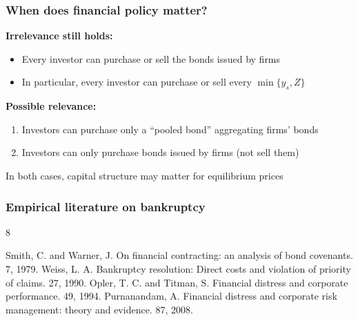 \documentclass[blue]{beamer}
\theoremstyle{definition}
\theoremstyle{example}
\begin{document}
\begin{frame}\frametitle{When does financial policy matter?}
\textbf{Irrelevance still holds:}
\begin{itemize}
\item Every investor can purchase or sell the bonds issued by firms
\item In particular, every investor can purchase or sell every $\min\{y_s, Z\}$
\end{itemize}
\bigskip

\textbf{Possible relevance:}
\begin{enumerate}
\item Investors can purchase only a ``pooled bond'' aggregating firms' bonds
\item Investors can only purchase bonds issued by firms (not sell them)
\end{enumerate}
\bigskip

In both cases, capital structure may matter for equilibrium prices
\end{frame}

\begin{frame}\frametitle{Empirical literature on bankruptcy}
\begin{thebibliography}{8}
\begin{small}
\beamertemplatearticlebibitems
    Smith, C. and Warner, J.
    \newblock On financial contracting: an analysis of bond covenants.
     7, 1979.
    Weiss, L. A.
    \newblock Bankruptcy resolution: Direct costs and violation of priority of claims.
     27, 1990.
    Opler, T. C. and Titman, S.
    \newblock Financial distress and corporate performance.
     49, 1994.
    Purnanandam, A.
    \newblock Financial distress and corporate risk management: theory and evidence.
     87, 2008.
\end{small}
\end{thebibliography}
\end{frame}
\end{document}
